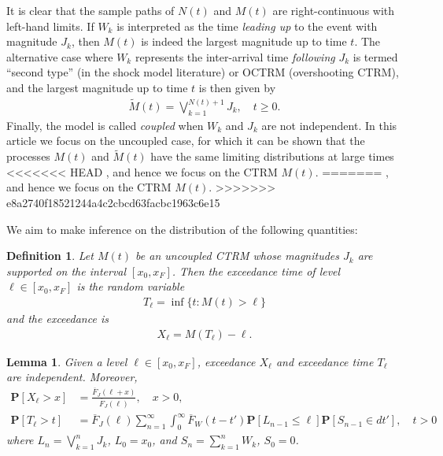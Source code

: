 \documentclass[12pt]{article}
\newtheorem{lemma}[theorem]{Lemma}
\newtheorem{definition}[theorem]{Definition}
\theoremstyle{definition}
\theoremstyle{remark}
\numberwithin{equation}{section}
\newcommand{\pr}{\mathbf {P}}
\newcommand{\1}{\mathbf 1}
\begin{document}
 

It is clear that the sample paths of $N(t)$ and $M(t)$ are right-continuous
with left-hand limits. 
If $W_k$ is interpreted as the time \emph{leading up} to the event with magnitude
$J_k$, then $M(t)$ is indeed the largest magnitude up to time $t$.
The alternative case where $W_k$ represents the inter-arrival time 
\textit{following} $J_k$ 
is termed ``second type'' (in the shock model literature) or OCTRM
(overshooting CTRM), and the largest magnitude up to time $t$ is then
given by
\begin{align}
\tilde M(t) = \bigvee_{k=1}^{N(t)+1} J_k, \quad t \ge 0.
\end{align}
Finally, the model is called \emph{coupled} when $W_k$ and $J_k$ are not independent.
In this article we focus on the uncoupled case,  
for which it can be shown that the processes $M(t)$ and
$\tilde M(t)$ have the same limiting distributions at large times
<<<<<<< HEAD
\cite{Hees16}, and hence we focus on the CTRM $M(t)$. 
=======
\cite{Hees2015}, and hence we focus on the CTRM $M(t)$. 
>>>>>>> e8a2740f18521244a4c2cbcd63facbc1963c6e15


We aim to make inference on the distribution of the following quantities:
\begin{definition}
Let $M(t)$ be an uncoupled CTRM whose magnitudes $J_k$ are supported on the interval
$[x_0, x_F]$.  Then the exceedance time of level $\ell \in [x_0,x_F]$ is
the random variable
\begin{align*}
T_\ell = \inf\{t: M(t) > \ell\}
\end{align*}
and the exceedance is 
\begin{align*}
X_\ell = M(T_\ell) - \ell.
\end{align*}
\end{definition}

\begin{lemma}
Given a level $\ell \in [x_0,x_F]$, exceedance $X_\ell$ and exceedance time
$T_\ell$ are independent. Moreover, 
\begin{align*}
\pr[X_\ell > x]
&= \frac{\overline F_J(\ell + x)}{\overline F_J(\ell)}, \quad x > 0,
\\
\pr[T_\ell > t]
&= \overline F_J(\ell) \sum_{n=1}^\infty \int_0^\infty \overline F_W(t-t') \pr[L_{n-1} \le \ell]
\pr[S_{n-1} \in dt'], \quad t > 0
\end{align*}
where $L_n = \bigvee_{k=1}^n J_k$, $L_0 = x_0$, and $S_n = \sum_{k=1}^n W_k$,
$S_0 = 0$.
\end{lemma}
\end{document}
